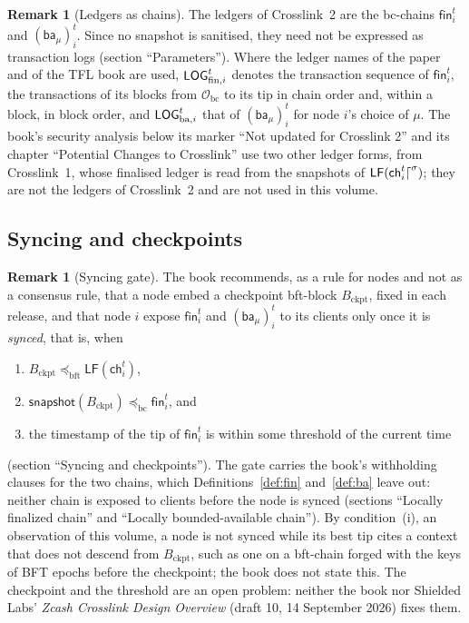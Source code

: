\documentclass[11pt,a4paper]{article}
\theoremstyle{definition}
\newtheorem{remark}[theorem]{Remark}
\newcommand{\bc}{\mathrm{bc}}
\newcommand{\bft}{\mathrm{bft}}
\newcommand{\Origin}{\mathcal{O}}
\newcommand{\Obc}{\Origin_{\bc}}
\newcommand{\preceqbc}{\preceq_{\bc}}
\newcommand{\preceqbft}{\preceq_{\bft}}
\newcommand{\ch}{\mathsf{ch}}
\newcommand{\snapshot}{\mathsf{snapshot}}
\newcommand{\LF}{\mathsf{LF}}
\newcommand{\fin}{\mathsf{fin}}
\newcommand{\ba}{\mathsf{ba}}
\newcommand{\Bckpt}{B_{\mathrm{ckpt}}}
\begin{document}
\begin{remark}[Ledgers as chains]\label{rem:ledger-names}
The ledgers of Crosslink~2 are the bc-chains $\fin_i^t$ and $(\ba_\mu)_i^t$.
Since no snapshot is sanitised, they need not be expressed as transaction
logs (section ``Parameters''). Where the ledger names of the paper and of the
TFL book are used, $\LOGfin[i]^t$ denotes the transaction sequence of
$\fin_i^t$, the transactions of its blocks from $\Obc$ to its tip in chain order
and, within a block, in block order, and $\LOGba[i]^t$ that of $(\ba_\mu)_i^t$
for node $i$'s choice of $\mu$. The book's security analysis below its marker
``Not updated for Crosslink 2'' and its chapter ``Potential Changes to
Crosslink'' use two other ledger forms, from Crosslink~1, whose finalised ledger
is read from the snapshots of $\LF(\ch_i^t\trunc{\sigma})$; they are not the
ledgers of Crosslink~2 and are not used in this volume.
\end{remark}

\subsection{Syncing and checkpoints}\label{sec:led-sync}

\begin{remark}[Syncing gate]\label{rem:sync}
The book recommends, as a rule for nodes and not as a consensus rule, that
a node embed a checkpoint bft-block $\Bckpt$, fixed in each release, and that
node $i$ expose $\fin_i^t$ and $(\ba_\mu)_i^t$ to its clients only once it is
\emph{synced}, that is, when
\begin{enumerate}[label=(\roman*)]
\item $\Bckpt \preceqbft \LF(\ch_i^t)$,
\item $\snapshot(\Bckpt) \preceqbc \fin_i^t$, and
\item the timestamp of the tip of $\fin_i^t$ is within some threshold of the
  current time
\end{enumerate}
(section ``Syncing and checkpoints''). The gate carries the book's withholding
clauses for the two chains, which Definitions~\ref{def:fin}
and~\ref{def:ba} leave out: neither chain is exposed to clients before the
node is synced (sections ``Locally finalized chain'' and ``Locally
bounded-available chain''). By condition~(i), an observation of this volume,
a node is not synced while its best tip cites a context that does not
descend from $\Bckpt$, such as one on a bft-chain forged with the keys of BFT
epochs before the checkpoint; the book does not state this. The checkpoint and
the threshold are an open problem: neither the book nor Shielded Labs'
\emph{Zcash Crosslink Design Overview} (draft 10, 14 September 2026) fixes them.
\end{remark}
\end{document}
